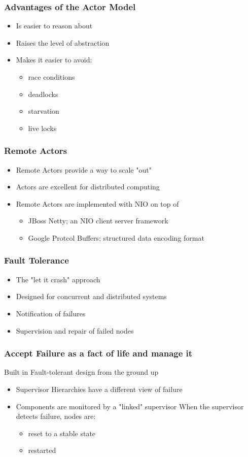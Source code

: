 \documentclass{beamer}
\begin{document}
\frame
    {
      \frametitle{Advantages of the Actor Model}
      \begin{itemize}
      \item Is easier to reason about
      \item Raises the level of abstraction
      \item Makes it easier to avoid:
        \begin{itemize}
        \item race conditions
        \item deadlocks
        \item starvation
        \item live locks
        \end{itemize}
      \end{itemize}
    }



\frame
{
  \frametitle{Remote Actors}
  \begin{itemize}
  \item Remote Actors provide a way to scale "out"
  \item Actors are excellent for distributed computing
  \item Remote Actors are implemented with NIO on top of
    \begin{itemize}
    \item JBoss Netty; an NIO client server framework
    \item Google Protcol Buffers; structured data encoding format
    \end{itemize}
  \end{itemize}
}


\frame
    {
      \frametitle{Fault Tolerance}
      \begin{itemize}
      \item The "let it crash" approach
      \item Designed for concurrent and distributed systems
      \item Notification of failures
      \item Supervision and repair of failed nodes
      \end{itemize}
    }


\frame
{
  \frametitle{Accept Failure as a fact of life and manage it}
  Built in Fault-tolerant design from the ground up
  \begin{itemize}
    \item Supervisor Hierarchies have a different view of failure
    \item Components are monitored by a "linked" supervisor
        When the supervisor detects failure, nodes are:
         \begin{itemize}
           \item reset to a stable state
           \item restarted
         \end{itemize}
  \end{itemize}
}
\end{document}
